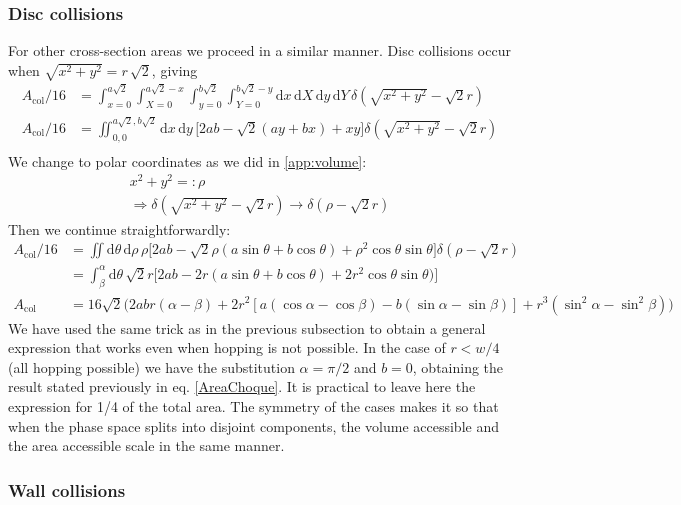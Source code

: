 \documentclass[superscriptaddress,pre,reprint,showpacs,onecolumn]{revtex4-1}
\newcommand{\rd}[1]{\mathrm{d}{#1} \,}
\begin{document}
  \subsubsection{Disc collisions}
  For other cross-section areas we proceed in a similar manner. 
  Disc collisions occur when $\sqrt{x^2 + y^2} = r \, \sqrt{2}$, giving
  \begin{align}
    A_\text{col}/16 & =\int_{x=0}^{a\sqrt{2}} \int_{X=0}^{a\sqrt{2}-x} \int_{y=0}^{b\sqrt{2}} \int_{Y=0}^{b\sqrt{2}-y}
    \rd x \rd X \rd y \rd Y
    \delta (\sqrt{x^2+y^2}-\sqrt{2}r)\\
    A_\text{col}/16 & =\iint _{0,0}^{a\sqrt{2},b\sqrt{2}}
    \rd x \rd y 
   \bigl[ 2ab-\sqrt{2}(ay+bx)+xy \bigr]
    \delta (\sqrt{x^2+y^2}-\sqrt{2}r)\\
    \end{align}
  We change to polar coordinates as we did in \ref{app:volume}:
  \begin{align}
    x^2+y^2 =: \rho \\   \Rightarrow   \delta(\sqrt{x^2+y^2}-\sqrt{2}r) \rightarrow
    \delta(\rho-\sqrt{2}r)   
    \end{align}
  Then we continue straightforwardly:
    \begin{align}\label{app:colgeneral}
    A_\text{col}/16 & =\iint 
    \rd \theta \rd \rho \rho
    \bigl[2ab-\sqrt{2}\rho(a\sin\theta+b\cos\theta)+\rho^2\cos\theta\sin\theta
      \bigr]
    \delta(\rho-\sqrt{2}r) \\
    &=\int_\beta^\alpha \rd \theta \sqrt{2}r
    \bigl[
      2ab-2r(a\sin\theta+b\cos\theta)+2r^2\cos\theta\sin\theta)
      \bigr] \\
    A_\text{col} & = 16\sqrt{2} \bigl( 2abr(\alpha-\beta)
    + 2r^2 [a (\cos \alpha-\cos\beta) -b (\sin\alpha -\sin\beta)]
     + r^3(\sin^2 \alpha -\sin^2\beta) \bigr)
    \end{align}
    We have used the same trick as in the previous
    subsection to obtain a general expression
    that works even when hopping is not possible.
    In the case of $r<w/4$ (all hopping possible)
    we have the substitution $\alpha=\pi/2$ and $b=0$,
    obtaining the result stated previously
    in eq. \ref{AreaChoque}. It is practical to leave here the expression for 1/4 of the
    total area. The symmetry of the cases makes it so that when the phase space splits
    into disjoint components, the volume accessible and the area accessible scale in
    the same manner.
    
    \subsubsection{Wall collisions}
\end{document}
